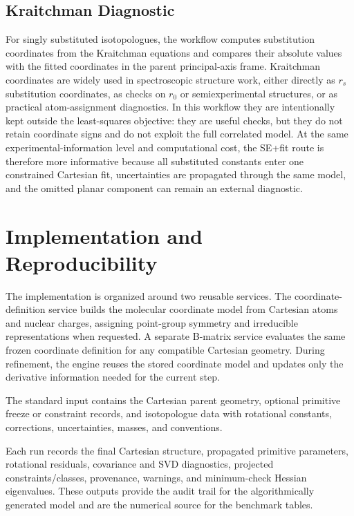 \documentclass[aip,jcp,reprint,longbibliography,floatfix]{revtex4-2}
\begin{document}
\subsection{Kraitchman Diagnostic}

For singly substituted isotopologues, the workflow computes substitution
coordinates from the Kraitchman equations\cite{Kraitchman1953} and compares
their absolute values with the fitted coordinates in the parent principal-axis
frame. Kraitchman coordinates are widely used in spectroscopic structure work,
either directly as $r_s$ substitution coordinates, as checks on $r_0$ or
semiexperimental structures, or as practical atom-assignment diagnostics. In
this workflow they are intentionally kept outside the least-squares objective:
they are useful checks, but they do not retain coordinate signs and do not
exploit the full correlated model. At the same experimental-information level
and computational cost, the SE+fit route is therefore more informative because
all substituted constants enter one constrained Cartesian fit, uncertainties
are propagated through the same model, and the omitted planar component can
remain an external diagnostic.


\section{Implementation and Reproducibility}

The implementation is organized around two reusable services. The
coordinate-definition service builds the molecular coordinate model from
Cartesian atoms and nuclear charges, assigning point-group symmetry and
irreducible representations when requested. A separate B-matrix service
evaluates the same frozen coordinate definition for any compatible Cartesian
geometry. During refinement, the engine reuses the stored coordinate model
and updates only the derivative information needed for the current step.

The standard input contains the Cartesian parent geometry, optional primitive
freeze or constraint records, and isotopologue data with rotational constants,
corrections, uncertainties, masses, and conventions.

Each run records the final Cartesian structure, propagated primitive
parameters, rotational residuals, covariance and SVD diagnostics, projected
constraints/classes, provenance, warnings, and minimum-check Hessian
eigenvalues. These outputs provide the audit trail for the algorithmically
generated model and are the numerical source for the benchmark tables.
\end{document}
